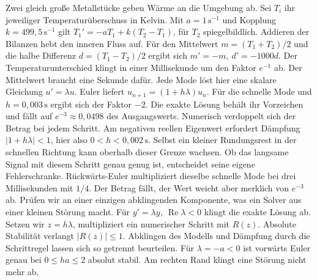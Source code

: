 \hypertarget{punkt1-3-1}{}
Zwei gleich große Metallstücke geben Wärme an die Umgebung ab. Sei \(T_i\) ihr jeweiliger Temperaturüberschuss in Kelvin. Mit \(a=1\,\mathrm{s}^{-1}\) und Kopplung \(k=499{,}5\,\mathrm{s}^{-1}\) gilt \(T_1'=-aT_1+k(T_2-T_1)\), für \(T_2\) spiegelbildlich. Addieren der Bilanzen hebt den inneren Fluss auf. Für den Mittelwert \(m=(T_1+T_2)/2\) und die halbe Differenz \(d=(T_1-T_2)/2\) ergibt sich \(m'=-m,\ d'=-1000d\). Der Temperaturunterschied klingt in einer Millisekunde um den Faktor \(e^{-1}\) ab. Der Mittelwert braucht eine Sekunde dafür.
\hypertarget{punkt1-3-2}{}
Jede Mode löst hier eine skalare Gleichung \(u'=\lambda u\). Euler liefert \(u_{n+1}=(1+h\lambda)u_n\). Für die schnelle Mode und \(h=0{,}003\,\mathrm s\) ergibt sich der Faktor \(-2\). Die exakte Lösung behält ihr Vorzeichen und fällt auf \(e^{-3}\approx0{,}0498\) des Ausgangswerts. Numerisch verdoppelt sich der Betrag bei jedem Schritt.
\hypertarget{punkt1-3-3}{}
Am negativen reellen Eigenwert erfordert Dämpfung \(|1+h\lambda|<1\), hier also \(0<h<0{,}002\,\mathrm s\). Selbst ein kleiner Rundungsrest in der schnellen Richtung kann oberhalb dieser Grenze wachsen. Ob das langsame Signal mit diesem Schritt genau genug ist, entscheidet seine eigene Fehlerschranke. Rückwärts-Euler multipliziert dieselbe schnelle Mode bei drei Millisekunden mit \(1/4\). Der Betrag fällt, der Wert weicht aber merklich von \(e^{-3}\) ab.
Prüfen wir an einer einzigen abklingenden Komponente, was ein Solver aus einer kleinen Störung macht. Für \(y'=\lambda y,\ \operatorname{Re}\lambda<0\) klingt die exakte Lösung ab. Setzen wir \(z=h\lambda\), multipliziert ein numerischer Schritt mit \(R(z)\). Absolute Stabilität verlangt \(|R(z)|\le1\). Abklingen des Modells und Dämpfung durch die Schrittregel lassen sich so getrennt beurteilen.
Für \(\lambda=-a<0\) ist vorwärts Euler genau bei \(0\le ha\le2\) absolut stabil. Am rechten Rand klingt eine Störung nicht mehr ab.
